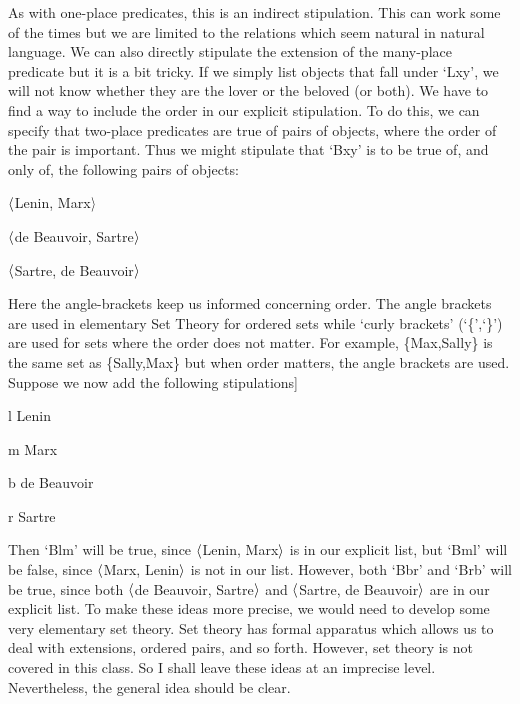 As with one-place predicates, this is an indirect stipulation. This can work some of the times but we are limited to the relations which seem natural in natural language. We can also directly stipulate the extension of the many-place predicate but it is a bit tricky. If we simply list objects that fall under ‘Lxy’, we will not know whether they are the lover or the beloved (or both). We have to find a way to include the order in our explicit stipulation. To do this, we can specify that two-place predicates are true of pairs of objects, where the order of the pair is important. Thus we might stipulate that ‘Bxy’ is to be true of, and only of, the following pairs of objects:
\begin{earg}
\item[]$\langle$Lenin, Marx$\rangle$
\item[]$\langle$de Beauvoir, Sartre$\rangle$
\item[]$\langle$Sartre, de Beauvoir$\rangle$
\end{earg}
Here the angle-brackets keep us informed concerning order. The angle brackets are used in elementary Set Theory for ordered sets while ‘curly brackets' (‘\{',‘\}') are used for sets where the order does not matter. For example, \{Max,Sally\} is the same set as \{Sally,Max\} but when order matters, the angle brackets are used. Suppose we now add the following stipulations]
\begin{ekey}
\item[l] Lenin
\item[m] Marx
\item[b] de Beauvoir
\item[r] Sartre
\end{ekey}
Then ‘Blm’ will be true, since $\langle$Lenin, Marx$\rangle$ is in our explicit list, but ‘Bml’ will be false, since $\langle$Marx, Lenin$\rangle$ is not in our list. However, both ‘Bbr’ and ‘Brb’ will be true, since both $\langle$de Beauvoir, Sartre$\rangle$ and $\langle$Sartre, de Beauvoir$\rangle$ are in our explicit list. To make these ideas more precise, we would need to develop some very elementary set theory. Set theory has formal apparatus which allows us to deal with extensions, ordered pairs, and so forth. However, set theory is not covered in this class. So I shall leave these ideas at an imprecise level. Nevertheless, the general idea should be clear.

